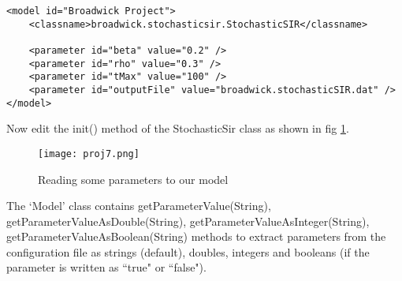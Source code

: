 \begin{sourcecode}
\begin{verbatim}
<model id="Broadwick Project">
    <classname>broadwick.stochasticsir.StochasticSIR</classname>

    <parameter id="beta" value="0.2" />
    <parameter id="rho" value="0.3" />
    <parameter id="tMax" value="100" />
    <parameter id="outputFile" value="broadwick.stochasticSIR.dat" />
</model> 
\end{verbatim}
\end{sourcecode}

Now edit the init() method of the StochasticSir class as shown in fig \ref{proj7}.

\begin{figure}[h!]
\centering\texttt{[image: proj7.png]}
\caption{Reading some parameters to our model}
\label{proj7}
\end{figure}

The `Model' class contains getParameterValue(String), getParameterValueAsDouble(String), getParameterValueAsInteger(String), getParameterValueAsBoolean(String) methods to extract parameters from the configuration file as strings (default), doubles, integers and booleans (if the parameter is written as ``true" or ``false").

